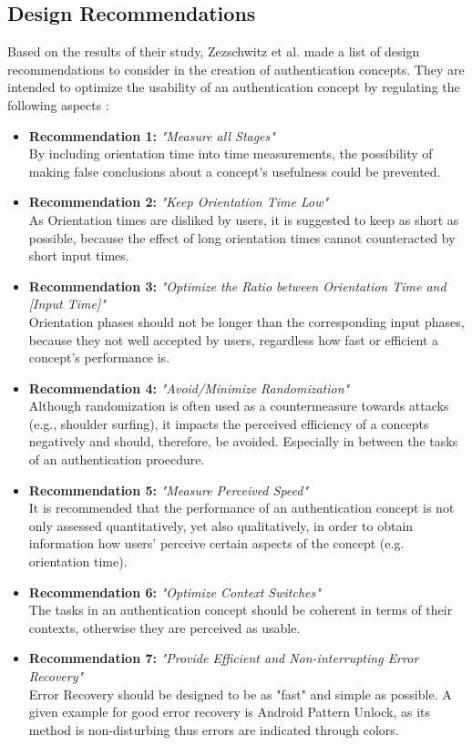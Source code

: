 \subsection{Design Recommendations} \label{3.2.2}

Based on the results of their study, Zezschwitz et al. \cite{Zezschwitz} made a list of design recommendations to consider in the creation of authentication concepts. They are intended to optimize the usability of an authentication concept by regulating the following aspects \cite{Zezschwitz}:

\begin{itemize}
    \item \textbf{Recommendation 1:} \textit{"Measure all Stages"}\\
    By including orientation time into time measurements, the possibility of making false conclusions about a concept's usefulness could be prevented.
    \item \textbf{Recommendation 2:} \textit{"Keep Orientation Time Low"}\\
    As Orientation times are disliked by users, it is suggested to keep as short as possible, because the effect of long orientation times cannot counteracted by short input times.
    \item \textbf{Recommendation 3:} \textit{"Optimize the Ratio between Orientation Time and [Input Time]"} \\
    Orientation phases should not be longer than the corresponding input phases, because they not well accepted by users, regardless how fast or efficient a concept's performance is.
    \item \textbf{Recommendation 4:} \textit{"Avoid/Minimize Randomization"}\\ 
    Although randomization is often used as a countermeasure towards attacks (e.g., shoulder surfing), it impacts the perceived efficiency of a concepts negatively and should, therefore, be avoided. Especially in between the tasks of an authentication proecdure.
    \item \textbf{Recommendation 5:} \textit{"Measure Perceived Speed"}\\
    It is recommended that the performance of an authentication concept is not only assessed quantitatively, yet also qualitatively, in order to obtain information how users' perceive certain aspects of the concept (e.g. orientation time).  
    \item \textbf{Recommendation 6:} \textit{"Optimize Context Switches"}\\
    The tasks in an authentication concept should be coherent in terms of their contexts, otherwise they are perceived as usable. 
    \item \textbf{Recommendation 7:} \textit{"Provide Efficient and Non-interrupting Error Recovery"}\\
    Error Recovery should be designed to be as "fast" and simple as possible. A given example for good error recovery is Android Pattern Unlock, as its method is non-disturbing thus errors are indicated through colors.  
    
    
\end{itemize}


